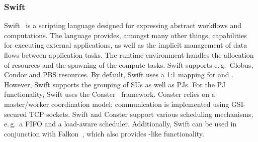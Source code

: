\documentclass{sig-alternate}
\begin{document}
\subsubsection{Swift}
Swift~\cite{Wilde2011} is a scripting language designed for expressing
abstract workflows and computations. The language provides, amongst many other
things, capabilities for executing external applications, as well as the
implicit management of data flows between application tasks. 
The runtime environment handles the allocation of resources and the spawning of 
the compute tasks. 
Swift supports e.\,g.\ Globus, Condor and PBS resources. 
By default, Swift uses a 1:1 mapping for \cus and \sus. However,
Swift supports the grouping of SUs as well as PJs. For the PJ functionality, Swift uses the
Coaster~\cite{coasters} framework. Coaster relies on a master/worker
coordination model; communication is implemented using GSI-secured TCP sockets.
Swift and Coaster support various scheduling mechanisms, e.\,g.\ a FIFO and a
load-aware scheduler. Additionally, Swift can be used in conjunction with 
Falkon~\cite{1362680}, which also provides \pilot-like functionality.

\end{document}
